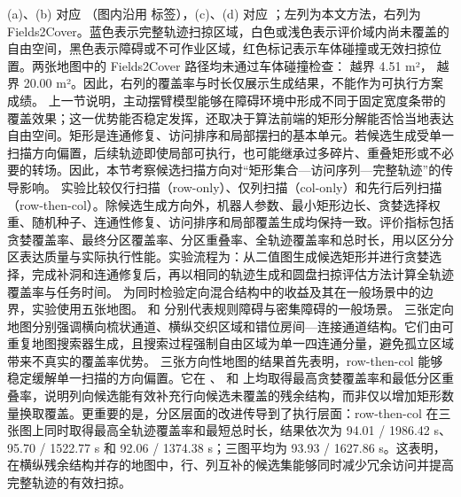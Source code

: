 {} (a)、(b) 对应 （图内沿用  标签），(c)、(d) 对应 ；左列为本文方法，右列为 Fields2Cover。蓝色表示完整轨迹扫掠区域，白色或浅色表示评价域内尚未覆盖的自由空间，黑色表示障碍或不可作业区域，红色标记表示车体碰撞或无效扫掠位置。两张地图中的 Fields2Cover 路径均未通过车体碰撞检查： 越界 4.51 m²， 越界 20.00 m²。因此，右列的覆盖率与时长仅展示生成结果，不能作为可执行方案成绩。\markdownRendererParagraphSeparator
{}
\markdownRendererSectionEnd \markdownRendererSectionBegin
{}\markdownRendererParagraphSeparator
{}上一节说明，主动摆臂模型能够在障碍环境中形成不同于固定宽度条带的覆盖效果；这一优势能否稳定发挥，还取决于算法前端的矩形分解能否恰当地表达自由空间。矩形是连通修复、访问排序和局部摆扫的基本单元。若候选生成受单一扫描方向偏置，后续轨迹即使局部可执行，也可能继承过多碎片、重叠矩形或不必要的转场。因此，本节考察候选扫描方向对“矩形集合—访问序列—完整轨迹”的传导影响。\markdownRendererParagraphSeparator
{}实验比较仅行扫描（row-only）、仅列扫描（col-only）和先行后列扫描（row-then-col）。除候选生成方向外，机器人参数、最小矩形边长、贪婪选择权重、随机种子、连通性修复、访问排序和局部覆盖生成均保持一致。评价指标包括贪婪覆盖率、最终分区覆盖率、分区重叠率、全轨迹覆盖率和总时长，用以区分分区表达质量与实际执行性能。实验流程为：从二值图生成候选矩形并进行贪婪选择，完成补洞和连通修复后，再以相同的轨迹生成和圆盘扫掠评估方法计算全轨迹覆盖率与任务时间。\markdownRendererParagraphSeparator
{}为同时检验定向混合结构中的收益及其在一般场景中的边界，实验使用五张地图。 和  分别代表规则障碍与密集障碍的一般场景。\markdownRendererParagraphSeparator
{}三张定向地图分别强调横向梳状通道、横纵交织区域和错位房间—连接通道结构。它们由可重复地图搜索器生成，且搜索过程强制自由区域为单一四连通分量，避免孤立区域带来不真实的覆盖率优势。\markdownRendererParagraphSeparator
{}\markdownRendererParagraphSeparator
{}三张方向性地图的结果首先表明，row-then-col 能够稳定缓解单一扫描的方向偏置。它在 、 和  上均取得最高贪婪覆盖率和最低分区重叠率，说明列向候选能有效补充行向候选未覆盖的残余结构，而非仅以增加矩形数量换取覆盖。更重要的是，分区层面的改进传导到了执行层面：row-then-col 在三张图上同时取得最高全轨迹覆盖率和最短总时长，结果依次为 94.01\markdownRendererPercentSign{} / 1986.42 s、95.70\markdownRendererPercentSign{} / 1522.77 s 和 92.06\markdownRendererPercentSign{} / 1374.38 s；三图平均为 93.93\markdownRendererPercentSign{} / 1627.86 s。这表明，在横纵残余结构并存的地图中，行、列互补的候选集能够同时减少冗余访问并提高完整轨迹的有效扫掠。\markdownRendererParagraphSeparator
